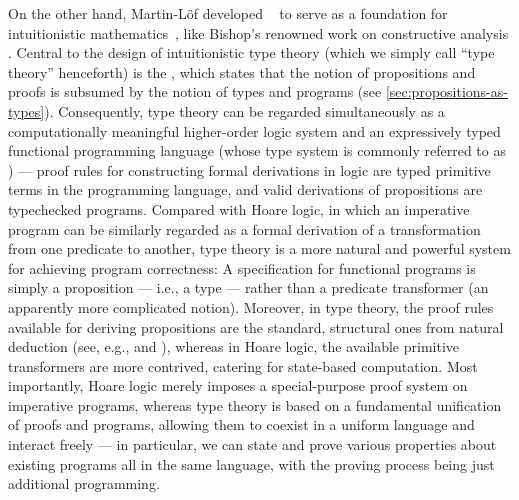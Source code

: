 On the other hand, Martin-Löf developed ~\citep{ML-TT73, ML-TT84, Nordstrom-programming} to serve as a foundation for intuitionistic mathematics~\citep{Heyting-intuitionism, Dummett-intuitionism}, like Bishop's renowned work on constructive analysis \citep{Bishop-analysis}.
Central to the design of intuitionistic type theory (which we simply call ``type theory'' henceforth) is the , which states that the notion of propositions and proofs is subsumed by the notion of types and programs (see \autoref{sec:propositions-as-types}).
Consequently, type theory can be regarded simultaneously as a computationally meaningful higher-order logic system and an expressively typed functional programming language (whose type system is commonly referred to as ) --- proof rules for constructing formal derivations in logic are typed primitive terms in the programming language, and valid derivations of propositions are typechecked programs.
Compared with Hoare logic, in which an imperative program can be similarly regarded as a formal derivation of a transformation from one predicate to another, type theory is a more natural and powerful system for achieving program correctness:
A specification for functional programs is simply a proposition --- i.e., a type --- rather than a predicate transformer (an apparently more complicated notion).
Moreover, in type theory, the proof rules available for deriving propositions are the standard, structural ones from natural deduction (see, e.g., \citet{Girard-proofs-and-types} and \citet{vanDalen-logic}), whereas in Hoare logic, the available primitive transformers are more contrived, catering for state-based computation.
Most importantly, Hoare logic merely imposes a special-purpose proof system on imperative programs, whereas type theory is based on a fundamental unification of proofs and programs, allowing them to coexist in a uniform language and interact freely --- in particular, we can state and prove various properties about existing programs all in the same language, with the proving process being just additional programming.

